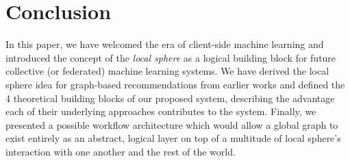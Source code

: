 \documentclass{llncs}
\begin{document}
\section{Conclusion}
\label{sect:conclusion}

In this paper, we have welcomed the era of client-side machine learning and introduced the concept of the \textit{local sphere} as a logical building block for future collective (or federated) machine learning systems. We have derived the local sphere idea for graph-based recommendations from earlier works and defined the 4 theoretical building blocks of our proposed system, describing the advantage each of their underlying approaches contributes to the system. Finally, we presented a possible workflow architecture which would allow a global graph to exist entirely as an abstract, logical layer on top of a multitude of local sphere's interaction with one another and the rest of the world.

\newpage



\end{document}
